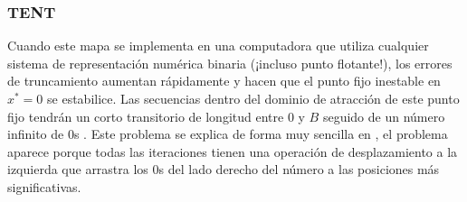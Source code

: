 \subsubsection{TENT} \label{sssec:tent}

Cuando este mapa se implementa en una computadora que utiliza cualquier sistema de representación numérica binaria (¡incluso punto flotante!), los errores de truncamiento aumentan rápidamente y hacen que el punto fijo inestable en $x^* = 0$ se estabilice.
Las secuencias dentro del dominio de atracción de este punto fijo tendrán un corto transitorio de longitud entre $0$ y $B$ seguido de un número infinito de $0$s \cite{Jessa2002, Callegari}.
Este problema se explica de forma muy sencilla en \cite{Li2004}, el problema aparece porque todas las iteraciones tienen una operación de desplazamiento a la izquierda que arrastra los $0$s del lado derecho del número a las posiciones más significativas.

